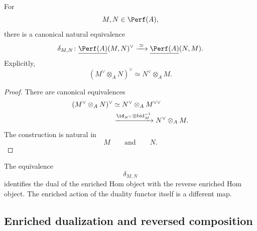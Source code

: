 \begin{theorem}
\label{thm:duality-enriched-hom}
For
\[
    M,N\in\Perf(A),
\]
there is a canonical natural equivalence
\[
    \delta_{M,N}
    \colon
    \underline{\Perf(A)}(M,N)^\vee
    \xrightarrow{\;\simeq\;}
    \underline{\Perf(A)}(N,M).
\]
Explicitly,
\[
    (M^\vee\otimes_A N)^\vee
    \simeq
    N^\vee\otimes_A M.
\]
\end{theorem}

\begin{proof}
There are canonical equivalences
\[
\begin{aligned}
    (M^\vee\otimes_A N)^\vee
    &\simeq
    N^\vee\otimes_A M^{\vee\vee}
    \\
    &\xrightarrow{
        \id_{N^\vee}
        \otimes
        \operatorname{bid}_M^{-1}
    }
    N^\vee\otimes_A M.
\end{aligned}
\]
The construction is natural in
\[
    M
    \qquad\text{and}\qquad
    N.
\]
\end{proof}

The equivalence
\[
    \delta_{M,N}
\]
identifies the dual of the enriched Hom object with the reverse enriched
Hom object. The enriched action of the duality functor itself is a
different map.


\subsection{Enriched dualization and reversed composition}

